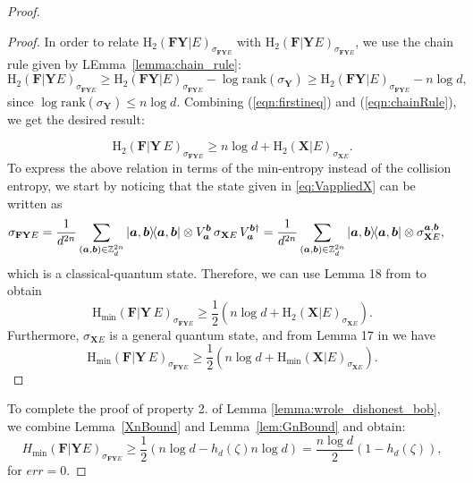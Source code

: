 \begin{proof}
\begin{proof}
In order to relate $\text{H}_2(\mathbf{F}\mathbf{Y} | E)_{\sigma_{\mathbf{F}\mathbf{Y} E}}$ with $\text{H}_2(\mathbf{F} | \mathbf{Y} E)_{\sigma_{\mathbf{F}\mathbf{Y} E}}$, we use the chain rule given by LEmma~\ref{lemma:chain_rule}:
\begin{equation}
\text{H}_2(\mathbf{F} | \mathbf{Y} E)_{\sigma_{\mathbf{F}\mathbf{Y} E}} \geq \text{H}_2(\mathbf{F}\mathbf{Y} | E)_{\sigma_{\mathbf{F}\mathbf{Y} E}} - \log \text{rank}(\sigma_{\mathbf{Y}}) \geq \text{H}_2(\mathbf{F}\mathbf{Y} | E)_{\sigma_{\mathbf{F}\mathbf{Y} E}} - n \log d,
 \label{eqn:chainRule} 
\end{equation}
since $\log \text{rank}(\sigma_{\mathbf{Y}}) \leq n \log d$. Combining (\ref{eqn:firstineq}) and (\ref{eqn:chainRule}), we get the desired result:

\begin{equation*}
    \text{H}_2(\mathbf{F}|\mathbf{Y}\, E)_{\sigma_{\mathbf{F}\mathbf{Y} E}} \geq n\log d + \text{H}_2(\mathbf{X}| E)_{\sigma_{\mathbf{X} E}}.
\end{equation*}
To express the above relation in terms of the min-entropy instead of the collision entropy, we start by noticing that 
 the state given in \eqref{eq:VappliedX} can be written as 
\begin{align}
  \sigma_{\mathbf{F}\mathbf{Y} E} &= \frac{1}{d^{2n}} \sum_{(\bm{a}, \bm{b}) \in \mathbb{Z}^{2n}_d} \ketbra{\bm{a},\bm{b}}\otimes V^{\bm{b}}_{\bm{a}} \, \sigma_{\mathbf{X} E}\,  V^{\bm{b}\dagger}_{\bm{a}} = \frac{1}{d^{2n}} \sum_{(\bm{a}, \bm{b}) \in \mathbb{Z}^{2n}_d} \ketbra{\bm{a},\bm{b}}\otimes \sigma_{\mathbf{X} E}^{\bm{a},\bm{b}},
\end{align}
which is a classical-quantum state. Therefore, we can use Lemma 18 from \cite{Dupuis2015} to obtain
\begin{equation*}
     \text{H}_{\text{min}}(\mathbf{F}|\mathbf{Y}\, E)_{\sigma_{\mathbf{F}\mathbf{Y} E}}  \geq \frac{1}{2}\left(n\log d + \text{H}_2(\mathbf{X}| E)_{\sigma_{\mathbf{X} E}}\right).
\end{equation*}
Furthermore,  $\sigma_{\mathbf{X}E}$  is a general quantum state, and from Lemma 17 in \cite{Dupuis2015} we have 
\begin{equation*}
    \text{H}_{\text{min}}(\mathbf{F}|\mathbf{Y}\, E)_{\sigma_{\mathbf{F}\mathbf{Y} E}}  \geq \frac{1}{2}\left(n\log d + \text{H}_{\text{min}}(\mathbf{X}| E)_{\sigma_{\mathbf{X} E}} \right).
\end{equation*}
\end{proof}



To complete the proof of property 2. of Lemma \ref{lemma:wrole_dishonest_bob}, we  combine Lemma~\ref{XnBound} and Lemma~\ref{lem:GnBound}  and obtain:
\begin{equation*}
H_{\min}(\mathbf{F} | \mathbf{Y} E)_{\sigma_{\mathbf{F}\mathbf{Y} E}} \geq \frac{1}{2}(n\log d - h_d(\zeta)n\log d) = \frac{n\log d}{2}(1 - h_d(\zeta)),
\end{equation*}
for $err = 0$.

\end{proof}

%
%
%
%
%
%
%